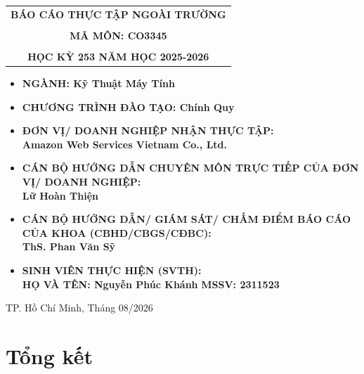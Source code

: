 \documentclass[a4paper]{article}
\theoremstyle{definition}
\begin{document}
\begin{titlepage}
\begin{center}
\begin{tabular}{c}
\multicolumn{1}{c}{\textbf{{\LARGE BÁO CÁO THỰC TẬP NGOÀI TRƯỜNG}}}\\
\\{\textbf{{\Large MÃ MÔN: CO3345}}}
\\
\\
\textbf{\Large HỌC KỲ 253 NĂM HỌC 2025-2026} \\
\end{tabular}
\end{center}
\vspace{0.3cm}
\begin{itemize}
\renewcommand\labelitemi{--}
    \item \Large \textbf{NGÀNH: Kỹ Thuật Máy Tính}
    \item \Large \textbf{CHƯƠNG TRÌNH ĐÀO TẠO: Chính Quy}
\end{itemize}
\vspace{0.3cm}
\begin{itemize}
\renewcommand\labelitemi{--}
    \item \Large \textbf{ĐƠN VỊ/ DOANH NGHIỆP NHẬN THỰC TẬP:}
    \\ \Large \textbf{Amazon Web Services Vietnam Co., Ltd.}
    \item \Large \textbf{CÁN BỘ HƯỚNG DẪN CHUYÊN MÔN TRỰC TIẾP CỦA ĐƠN VỊ/ DOANH NGHIỆP:}
    \\ \Large \textbf{Lữ Hoàn Thiện}
    \item \Large \textbf{CÁN BỘ HƯỚNG DẪN/ GIÁM SÁT/ CHẤM ĐIỂM BÁO CÁO CỦA KHOA (CBHD/CBGS/CĐBC):}
    \\ \Large \textbf{ThS. Phan Văn Sỹ}
    \item \Large \textbf{SINH VIÊN THỰC HIỆN (SVTH):}
    \\ \Large \textbf{HỌ VÀ TÊN: Nguyễn Phúc Khánh} \textbf{MSSV: 2311523}
\end{itemize}
\vspace{0.3cm}
\begin{center}
{\Large TP. Hồ Chí Minh, Tháng 08/2026}
\end{center}
\end{titlepage}

\newpage
\tableofcontents
\newpage





\newpage
\section{Tổng kết}
\end{document}
